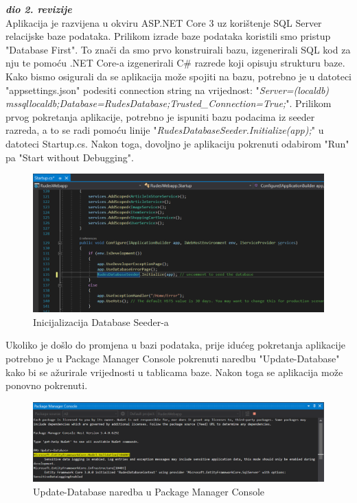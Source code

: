 			\textbf{\textit{dio 2. revizije}}\\
			 
			 \textnormal{Aplikacija je razvijena u okviru ASP.NET Core 3 uz korištenje SQL Server relacijske baze podataka. Prilikom izrade baze podataka koristili smo pristup "Database First". To znači da smo prvo konstruirali bazu, izgenerirali SQL kod za nju te pomoću .NET Core-a izgenerirali C\# razrede koji opisuju strukturu baze. Kako bismo osigurali da se aplikacija može spojiti na bazu, potrebno je u datoteci "appsettings.json" podesiti connection string na vrijednost: "\textit{Server=(localdb)\\mssqllocaldb;Database=RudesDatabase;Trusted\_Connection=True;}". Prilikom prvog pokretanja aplikacije, potrebno je ispuniti bazu podacima iz seeder razreda, a to se radi pomoću linije "\textit{RudesDatabaseSeeder.Initialize(app);}" u datoteci Startup.cs. Nakon toga, dovoljno je aplikaciju pokrenuti odabirom "Run" pa "Start without Debugging".}
			 
			 \begin{figure}[H]
			 	\includegraphics[width=\linewidth]{deployment/database_seeder.png}
			 	\centering
			 	\caption{Inicijalizacija Database Seeder-a}
			 	\label{fig:ClassDiagram1}
			 \end{figure}
			 
			 \textnormal{Ukoliko je došlo do promjena u bazi podataka, prije idućeg pokretanja aplikacije potrebno je u Package Manager Console pokrenuti naredbu "Update-Database" kako bi se ažurirale vrijednosti u tablicama baze. Nakon toga se aplikacija može ponovno pokrenuti.}
			 
			 \begin{figure}[H]
			 	\includegraphics[width=\linewidth]{deployment/pmc_update_database.png}
			 	\centering
			 	\caption{Update-Database naredba u Package Manager Console}
			 	\label{fig:ClassDiagram1}
			 \end{figure}	
			
			\eject 